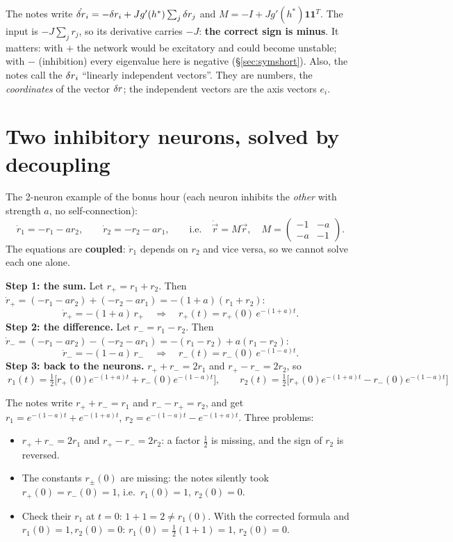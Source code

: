 \begin{pitfall}
The notes write $\dot{\delta r}_i=-\delta r_i+Jg'(h^*)\sum_j\delta r_j$ and $M=-I+Jg'(h^*)\mathbf1\mathbf1^T$. The input is $-J\sum_jr_j$, so its derivative carries $-J$:
\textbf{the correct sign is minus}. It matters: with $+$ the network would be excitatory and could become unstable; with $-$ (inhibition) every eigenvalue here is negative (\S\ref{sec:symshort}).
Also, the notes call the $\delta r_i$ ``linearly independent vectors''. They are numbers, the \emph{coordinates} of the vector $\delta r$; the independent vectors are the axis vectors $e_i$.
\end{pitfall}

\section{Two inhibitory neurons, solved by decoupling}

The 2-neuron example of the bonus hour (each neuron inhibits the \emph{other} with strength $a$, no self-connection):
\[ \dot r_1=-r_1-ar_2,\qquad \dot r_2=-r_2-ar_1,\qquad\text{i.e.}\quad \dot{\vec r}=M\vec r,\quad M=\begin{pmatrix}-1&-a\\-a&-1\end{pmatrix}. \]
The equations are \textbf{coupled}: $\dot r_1$ depends on $r_2$ and vice versa, so we cannot solve each one alone.

\textbf{Step 1: the sum.} Let $r_+=r_1+r_2$. Then $\dot r_+=(-r_1-ar_2)+(-r_2-ar_1)=-(1+a)(r_1+r_2)$:
\[ \dot r_+=-(1+a)\,r_+\quad\Rightarrow\quad r_+(t)=r_+(0)\,e^{-(1+a)t}. \]
\textbf{Step 2: the difference.} Let $r_-=r_1-r_2$. Then $\dot r_-=(-r_1-ar_2)-(-r_2-ar_1)=-(r_1-r_2)+a(r_1-r_2)$:
\[ \dot r_-=-(1-a)\,r_-\quad\Rightarrow\quad r_-(t)=r_-(0)\,e^{-(1-a)t}. \]
\textbf{Step 3: back to the neurons.} $r_++r_-=2r_1$ and $r_+-r_-=2r_2$, so
\[ \boxed{\ r_1(t)=\tfrac12\big[r_+(0)e^{-(1+a)t}+r_-(0)e^{-(1-a)t}\big],\qquad r_2(t)=\tfrac12\big[r_+(0)e^{-(1+a)t}-r_-(0)e^{-(1-a)t}\big]\ } \]

\begin{pitfall}
The notes write $r_++r_-=r_1$ and $r_--r_+=r_2$, and get $r_1=e^{-(1-a)t}+e^{-(1+a)t}$, $r_2=e^{-(1-a)t}-e^{-(1+a)t}$. Three problems:
\begin{itemize}
  \item $r_++r_-=2r_1$ and $r_+-r_-=2r_2$: a factor $\tfrac12$ is missing, and the sign of $r_2$ is reversed.
  \item The constants $r_\pm(0)$ are missing: the notes silently took $r_+(0)=r_-(0)=1$, i.e.\ $r_1(0)=1$, $r_2(0)=0$.
  \item Check their $r_1$ at $t=0$: $1+1=2\ne r_1(0)$. With the corrected formula and $r_1(0)=1,r_2(0)=0$: $r_1(0)=\tfrac12(1+1)=1$, $r_2(0)=0$. \checkmark
\end{itemize}
\end{pitfall}

